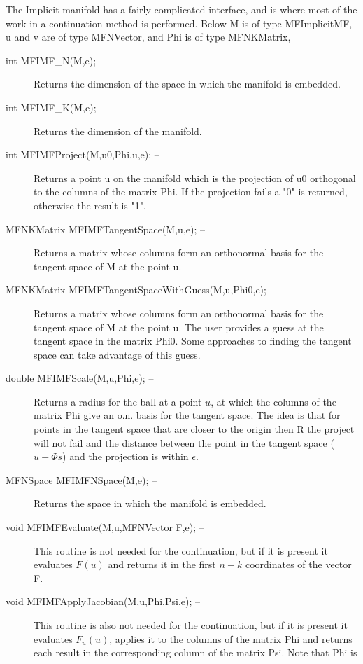 \documentclass[12pt]{article}
\begin{document}
    The Implicit manifold has a fairly complicated interface, and is where most of the work in a continuation method is
    performed. Below {M} is of type {MFImplicitMF}, {u} and {v} are of type {MFNVector},
    and {Phi} is of type {MFNKMatrix},
    \begin{description}
     \item [int MFIMF\_N(M,e); --]
        Returns the dimension of the space in which the manifold is embedded.
     \item [int MFIMF\_K(M,e); --]
        Returns the dimension of the manifold.
     \item [int MFIMFProject(M,u0,Phi,u,e); --]
        Returns a point {u} on the manifold which is the projection of {u0} orthogonal to the columns of the matrix {Phi}.
        If the projection fails a "0" is returned, otherwise the result is "1".
     \item [MFNKMatrix MFIMFTangentSpace(M,u,e); --]
        Returns a matrix whose columns form an orthonormal basis for the tangent space of {M} at the point {u}.
     \item [MFNKMatrix MFIMFTangentSpaceWithGuess(M,u,Phi0,e); --]
        Returns a matrix whose columns form an orthonormal basis for the tangent space of {M} at the point {u}. The user
        provides a guess at the tangent space in the matrix {Phi0}. Some approaches to finding the tangent space can take
        advantage of this guess.
     \item [double MFIMFScale(M,u,Phi,e); --]
        Returns a radius for the ball at a point $u$, at which the columns of the matrix {Phi} give an o.n. basis for the tangent 
        space. The idea is that for points in the tangent space that are closer to the origin then {R} the project will 
        not fail and the distance between the point in the tangent space ($u+\Phi s$) and the projection is within $\epsilon$.
     \item [MFNSpace MFIMFNSpace(M,e); --]
        Returns the space in which the manifold is embedded.
     \item [void MFIMFEvaluate(M,u,MFNVector F,e); --]
        This routine is not needed for the continuation, but if it is present it evaluates $F(u)$ and returns it in the first
        $n-k$ coordinates of the vector {F}.
     \item [void MFIMFApplyJacobian(M,u,Phi,Psi,e); --]
        This routine is also not needed for the continuation, but if it is present it evaluates $F_u(u)$, applies it to the columns
        of the matrix {Phi} and returns each result in the corresponding column of the matrix {Psi}. Note that {Phi} is

\end{description}
\end{document}
